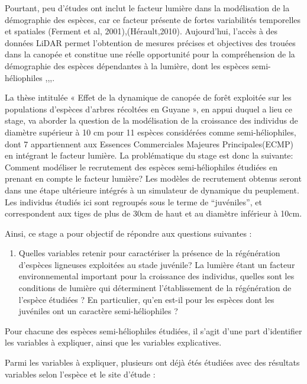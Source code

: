 \documentclass[
  12pt,
  american,
  a4paper,
  extrafontsizes,onecolumn,openright
  ]{memoir}
\providecommand{\tightlist}{%
  \setlength{\itemsep}{0pt}\setlength{\parskip}{0pt}}
\begin{document}
Pourtant, peu d'études ont inclut le facteur lumière dans la modélisation de la démographie des espèces, car ce facteur présente de fortes variabilités temporelles et spatiales (Ferment et al, 2001),(Hérault,2010). Aujourd'hui, l'accès à des données LiDAR permet l'obtention de mesures précises et objectives des trouées dans la canopée et constitue une réelle opportunité pour la compréhension de la démographie des espèces dépendantes à la lumière, dont les espèces semi-héliophiles \autocite{Hunter2015},\autocite{Goulamoussene2017},\autocite{Rangel2019},\autocite{Stark2015}.

La thèse intitulée « Effet de la dynamique de canopée de forêt exploitée sur les populations d'espèces d'arbres récoltées en Guyane », en appui duquel a lieu ce stage, va aborder la question de la modélisation de la croissance des individus de diamètre supérieur à 10 cm pour 11 espèces considérées comme semi-héliophiles, dont 7 appartiennent aux Essences Commerciales Majeures Principales(ECMP) en intégrant le facteur lumière.
La problématique du stage est donc la suivante: Comment modéliser le recrutement des espèces semi-héliophiles étudiées en prenant en compte le facteur lumière?
Les modèles de recrutement obtenus seront dans une étape ultérieure intégrés à un simulateur de dynamique du peuplement. Les individus étudiés ici sont regroupés sous le terme de ``juvéniles'', et correspondent aux tiges de plus de 30cm de haut et au diamètre inférieur à 10cm.

Ainsi, ce stage a pour objectif de répondre aux questions suivantes :

\begin{enumerate}
\def\labelenumi{\arabic{enumi})}
\tightlist
\item
  Quelles variables retenir pour caractériser la présence de la régénération d'espèces ligneuses exploitées au stade juvénile?
  La lumière étant un facteur environnemental important pour la croissance des individus, quelles sont les conditions de lumière qui déterminent l'établissement de la régénération de l'espèce étudiées ?
  En particulier, qu'en est-il pour les espèces dont les juvéniles ont un caractère semi-héliophiles ?
\end{enumerate}

Pour chacune des espèces semi-héliophiles étudiées, il s'agit d'une part d'identifier les variables à expliquer, ainsi que les variables explicatives.

Parmi les variables à expliquer, plusieurs ont déjà étés étudiées avec des résultats variables selon l'espèce et le site d'étude :
\end{document}
